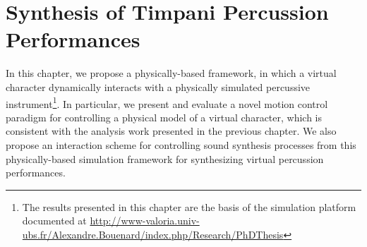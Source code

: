 \chapter{Synthesis of Timpani Percussion Performances}
\label{chapter:Synthesis}




In this chapter, we propose a physically-based framework, in which a virtual character dynamically interacts with a physically simulated percussive instrument\footnote{The results presented in this chapter are the basis of the simulation platform documented at \href{http://www-valoria.univ-ubs.fr/Alexandre.Bouenard/index.php/Research/PhDThesis}{http://www-valoria.univ-ubs.fr/Alexandre.Bouenard/index.php/Research/PhDThesis}}. In particular, we present and evaluate a novel motion control paradigm for controlling a physical model of a virtual character, which is consistent with the analysis work presented in the previous chapter. We also propose an interaction scheme for controlling sound synthesis processes from this physically-based simulation framework for synthesizing virtual percussion performances.\\

